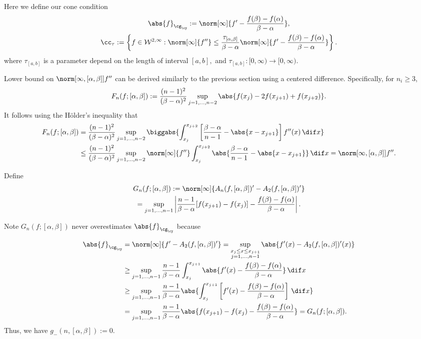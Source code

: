 \documentclass[]{elsarticle}
\theoremstyle{definition}
\theoremstyle{remark}
\newcommand{\GYnorm}[1]{\abs{#1}_{\cg_\cy}}
\begin{document}
Here we define our cone condition
\begin{subequations} \label{coneappxdef}
\begin{gather}
\GYnorm{f}:=\norm[\infty]{f'-\frac{f(\beta)-f(\alpha)}{\beta-\alpha}},\\
\cc_{\tau}:=\left\{f \in  \mathcal{W}^{2,\infty} : \norm[\infty]{f''}\leq \frac{\tau_{[\alpha,\beta]}}{\beta-\alpha} \norm[\infty]{f'-\frac{f(\beta)-f(\alpha)}{\beta-\alpha}}\right\}.
\end{gather}
\end{subequations}
where $\tau_{[a,b]}$ is a parameter depend on the length of interval $[a,b],$ and $\tau_{[a,b]}: [0, \infty) \rightarrow [0, \infty).$

Lower bound on $\norm[\infty,{[\alpha,\beta]}]{f''}$ can be derived similarly to the previous section using a centered difference.  Specifically, for $n_i \ge 3$,
\begin{equation} \label{Fnormappxalg}
F_{n}(f;[\alpha,\beta]) := \frac{(n-1)^2}{(\beta-\alpha)^2}\sup_{j=1, \ldots, n-2} \abs{f(x_j) - 2 f(x_{j+1})+f(x_{j+2})}.
\end{equation}
It follows using the H\"older's inequality that
\begin{align*}
F_{n}(f;[\alpha,\beta]) &= \frac{(n-1)^2}{(\beta-\alpha)^2}\sup_{j=1, \ldots, n-2}  \biggabs{\int_{x_j}^{x_{j+2}} \left[\frac{\beta-\alpha}{n-1} - \abs{x-x_{j+1}}\right] f''(x) \, \dif x} \\
&\le\frac{(n-1)^2}{(\beta-\alpha)^2}\sup_{j=1, \ldots, n-2}  \norm[\infty]{f''} \int_{x_j}^{x_{j+2}} \abs{\frac{\beta-\alpha}{n-1} - \abs{x-x_{j+1}}} \, \dif x = \norm[\infty,{[\alpha,\beta]}]{f''}.
\end{align*}


Define\begin{multline}\label{estfirstderiv}
G_n(f;[\alpha,\beta]) := \norm[\infty]{A_{n}(f,[\alpha,\beta])' - A_2(f,[\alpha,\beta])'} \\
= \sup_{j=1, \ldots, n-1} \left|\frac{n-1}{\beta-\alpha} [f(x_{j+1})-f(x_j)]-\frac{f(\beta)-f(\alpha)}{\beta-\alpha}\right|.
\end{multline}

Note $G_n(f;[\alpha,\beta])$ never overestimates $\GYnorm{f}$ because

\begin{align*}
\GYnorm{f} & = \norm[\infty]{f'-A_2(f,[\alpha,\beta])'}
= \sup_{\substack{x_j \le x \le x_{j+1}\\ j=1, \ldots, n-1 }} \abs{f'(x) - A_{2}(f,[\alpha,\beta])'(x)} \\
&\ge \sup_{j=1, \ldots, n-1} \frac{n-1}{\beta-\alpha}\int_{x_j}^{x_{j+1}} \abs{f'(x) - \frac{f(\beta)-f(\alpha)}{\beta-\alpha}} \, \dif x \\
&\ge \sup_{j=1, \ldots, n-1} \frac{n-1}{\beta-\alpha} \abs{\int_{x_j}^{x_{j+1}} \left[f'(x) -\frac{f(\beta)-f(\alpha)}{\beta-\alpha}\right] \, \dif x }\\
&= \sup_{j=1, \ldots, n-1} \frac{n-1}{\beta-\alpha} \abs{f(x_{j+1})-f(x_j) - \frac{f(\beta)-f(\alpha)}{\beta-\alpha}} =G_n(f;[\alpha,\beta]).
\end{align*}
Thus, we have $g_{-}(n,[\alpha,\beta]):=0$.
\end{document}
